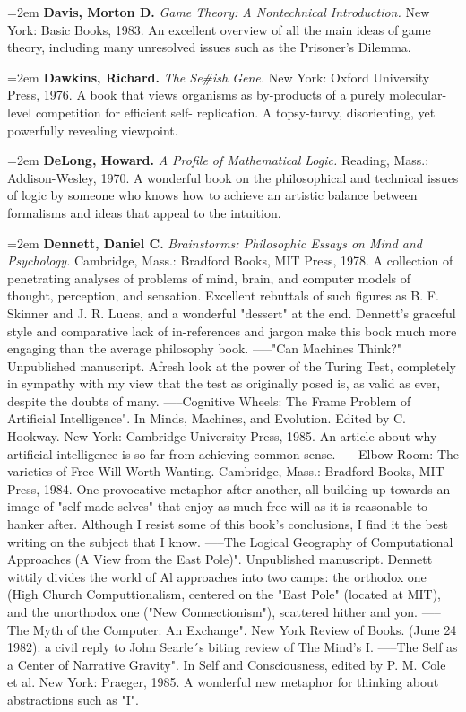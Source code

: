 \par\noindent\hangindent=2em {\bf Davis, Morton D.} {\it Game Theory: A Nontechnical Introduction.} New York: Basic Books, 1983. An excellent overview of all the main ideas of game theory, including many unresolved issues such as the Prisoner's Dilemma.

\par\noindent\hangindent=2em {\bf Dawkins, Richard.} {\it The Se\#ish Gene.} New York: Oxford University Press, 1976. A book that views organisms as by-products of a purely molecular-level competition for efficient self- replication. A topsy-turvy, disorienting, yet powerfully revealing viewpoint.

\par\noindent\hangindent=2em {\bf DeLong, Howard.} {\it A Profile of Mathematical Logic.} Reading, Mass.: Addison-Wesley, 1970. A wonderful book on the philosophical and technical issues of logic by someone who knows how to achieve an artistic balance between formalisms and ideas that appeal to the intuition.

\par\noindent\hangindent=2em {\bf Dennett, Daniel C.} {\it Brainstorms: Philosophic Essays on Mind and Psychology.} Cambridge, Mass.: Bradford Books, MIT Press, 1978. A collection of penetrating analyses of problems of mind, brain, and computer models of thought, perception, and sensation. Excellent rebuttals of such figures as B. F. Skinner and J. R. Lucas, and a wonderful "dessert" at the end. Dennett's graceful style and comparative lack of in-references and jargon make this book much more engaging than the average philosophy book. -----"Can Machines Think?" Unpublished manuscript. Afresh look at the power of the Turing Test, completely in sympathy with my view that the test as originally posed is, as valid as ever, despite the doubts of many. -----Cognitive Wheels: The Frame Problem of Artificial Intelligence". In Minds, Machines, and Evolution. Edited by C. Hookway. New York: Cambridge University Press, 1985. An article about why artificial intelligence is so far from achieving common sense. -----Elbow Room: The varieties of Free Will Worth Wanting. Cambridge, Mass.: Bradford Books, MIT Press, 1984. One provocative metaphor after another, all building up towards an image of "self-made selves" that enjoy as much free will as it is reasonable to hanker after. Although I resist some of this book's conclusions, I find it the best writing on the subject that I know. -----The Logical Geography of Computational Approaches (A View from the East Pole)". Unpublished manuscript. Dennett wittily divides the world of Al approaches into two camps: the orthodox one (High Church Computtionalism, centered on the "East Pole" (located at MIT), and the unorthodox one ("New Connectionism"), scattered hither and yon. -----The Myth of the Computer: An Exchange". New York Review of Books. (June 24 1982): a civil reply to John Searle´s biting review of The Mind's I. -----The Self as a Center of Narrative Gravity". In Self and Consciousness, edited by P. M. Cole et al. New York: Praeger, 1985. A wonderful new metaphor for thinking about abstractions such as "I".

